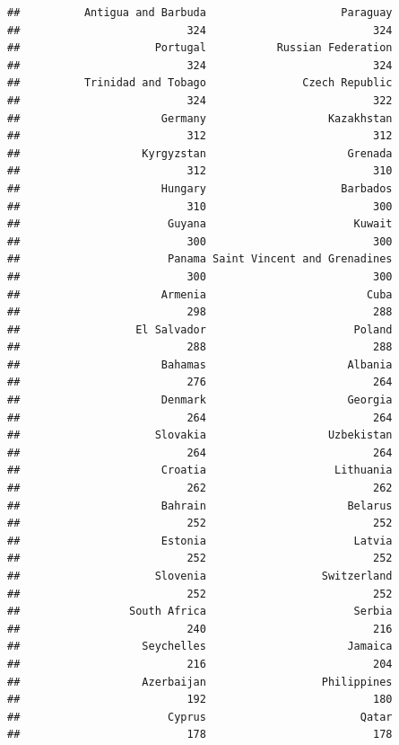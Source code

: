 \documentclass[]{article}
\begin{document}
\begin{verbatim}
##          Antigua and Barbuda                     Paraguay 
##                          324                          324 
##                     Portugal           Russian Federation 
##                          324                          324 
##          Trinidad and Tobago               Czech Republic 
##                          324                          322 
##                      Germany                   Kazakhstan 
##                          312                          312 
##                   Kyrgyzstan                      Grenada 
##                          312                          310 
##                      Hungary                     Barbados 
##                          310                          300 
##                       Guyana                       Kuwait 
##                          300                          300 
##                       Panama Saint Vincent and Grenadines 
##                          300                          300 
##                      Armenia                         Cuba 
##                          298                          288 
##                  El Salvador                       Poland 
##                          288                          288 
##                      Bahamas                      Albania 
##                          276                          264 
##                      Denmark                      Georgia 
##                          264                          264 
##                     Slovakia                   Uzbekistan 
##                          264                          264 
##                      Croatia                    Lithuania 
##                          262                          262 
##                      Bahrain                      Belarus 
##                          252                          252 
##                      Estonia                       Latvia 
##                          252                          252 
##                     Slovenia                  Switzerland 
##                          252                          252 
##                 South Africa                       Serbia 
##                          240                          216 
##                   Seychelles                      Jamaica 
##                          216                          204 
##                   Azerbaijan                  Philippines 
##                          192                          180 
##                       Cyprus                        Qatar 
##                          178                          178 

\end{verbatim}
\end{document}
